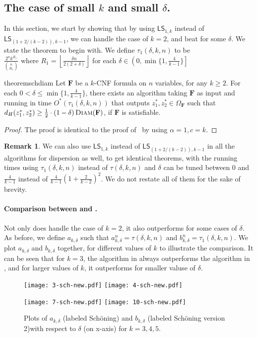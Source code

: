 \documentclass[11pt, letterpaper]{article}
\theoremstyle{definition}
\newtheorem{remark}{Remark}
\newcommand{\f}{\mathbf{F}}
\newcommand{\Om}{\Omega_{\f}}
\newcommand{\LS}{\textsf{LS}}
\newcommand{\D}{\textsc{Diam}}
\newcommand{\sch}{Sch\"{o}ning\xspace}
\newcommand{\floor}[1]{{\left\lfloor{#1}\right\rfloor}}
\begin{document}
\subsection{The case of small $k$ and small $\delta$.}
\label{app:more-sch}
In this section, we start by showing that by using $\LS_{1, k}$ instead of $\LS_{\left(1+2/(k-2)\right),k-1}$, we can handle the case of $k=2$, and beat  for some $\delta$. We state the theorem to begin with. We define $\tau_1(\delta,k, n)$ to be $\frac{2^n k^{R_1}}{\binom{n}{R_1}} \text{ where } R_1=\floor{\frac{\delta n}{2(2+\delta)}}$ for each $\delta \in \left( 0, \min\{1, \frac{4}{k-1} \}\right]$
\begin{restatable}[\sch for \D]{theorem}{schdiam}
    \label{thm:sch-for-dia-two}
    Let $\f$ be a $k$-CNF formula on $n$ variables, for any $k \geq 2$. For each $0 < \delta \leq \min\{1, \frac{4}{k-1} \}$, there exists an algorithm taking $\f$ as input and running in time $O^*\left( \tau_1(\delta, k, n)\right)$ that outputs $z_1^*, z_2^* \in \Om$ such that $d_H(z_1^*, z_2^*) \geq \frac{1}{2}\cdot \left(1-\delta \right) \D(\f)$, if $\f$ is satisfiable.
\end{restatable}
\begin{proof}
    The proof is identical to the proof of~ by using $\alpha=1, c=k$.  
\end{proof}
\begin{remark}
    We can also use $\LS_{1, k}$ instead of $\LS_{\left(1+2/(k-2)\right),k-1}$ in all the algorithms for dispersion as well, to get identical theorems, with the running times using $\tau_1(\delta,k, n)$ instead of $\tau(\delta, k, n)$ and $\delta$ can be tuned between $0$ and $\frac{4}{k-1}$ instead of $\frac{4}{k-1}\left(1+\frac{2}{k-2}\right)^2$. We do not restate all of them for the sake of brevity. 
\end{remark}
\paragraph{Comparison between  and .} Not only does  handle the case of $k=2$, it also outperforms  for some cases of $\delta$. As before, we define $a_{k, \delta}$ such that $a_{k,\delta}^n=\tau(\delta,k,n)$ and $b_{k,\delta}^n=\tau_1(\delta,k,n)$. We plot $a_{k,\delta}$ and $b_{k,\delta}$ together, for different values of $k$ to illustrate the comparison. It can be seen that for $k=3$, the algorithm in  always outperforms the algorithm in , and for larger values of $k$, it outperforms for smaller valuse of $\delta$. 
\begin{figure}[ht]
    \centering
    \texttt{[image: 3-sch-new.pdf]}
    \texttt{[image: 4-sch-new.pdf]}

    \texttt{[image: 7-sch-new.pdf]}
    \texttt{[image: 10-sch-new.pdf]}
    \caption{Plots of $a_{k,\delta}$ (labeled \sch) and $b_{k,\delta}$ (labeled \sch version 2)with respect to $\delta$ (on x-axis) for $k=3,4,5$.}
    \label{fig:enter-label}
\end{figure}
\end{document}
